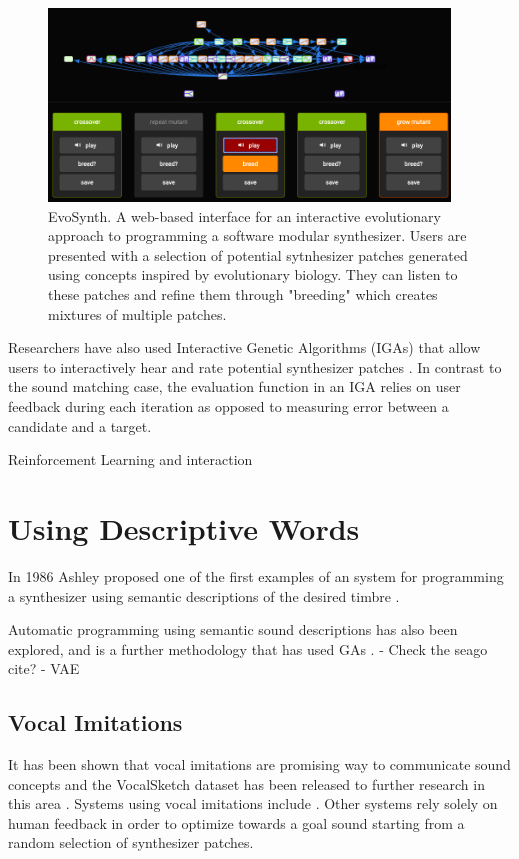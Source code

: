 \begin{figure}[ht]
    \centering
    \includegraphics[width=0.95\textwidth]{figures/background/EvoSynth.png}
    \caption{EvoSynth. A web-based interface for an interactive evolutionary approach to programming a software modular synthesizer. Users are presented with a selection of potential sytnhesizer patches generated using concepts inspired by evolutionary biology. They can listen to these patches and refine them through "breeding" which creates mixtures of multiple patches.}
    \label{fig:evosynth}
\end{figure}



Researchers have also used Interactive Genetic Algorithms (IGAs) that allow users to interactively hear and rate potential synthesizer patches \cite{johnson1999exploring, dahlstedt2001creating, yee2016use}. In contrast to the sound matching case, the evaluation function in an IGA relies on user feedback during each iteration as opposed to measuring error between a candidate and a target. 

Reinforcement Learning and interaction \cite{scurto2021designing}

\section{Using Descriptive Words}
In 1986 Ashley proposed one of the first examples of an system for programming a synthesizer using semantic descriptions of the desired timbre \cite{ashley1986knowledge}.

 Automatic programming using semantic sound descriptions has also been explored, and is a further methodology that has used GAs \cite{krekovic2016algorithm}.
 - Check the seago cite?
 \cite{roche2021make} - VAE

\subsection{Vocal Imitations}
It has been shown that vocal imitations are promising way to communicate sound concepts \cite{lemaitre2014effectiveness} and the VocalSketch dataset has been released to further research in this area \cite{cartwright2015vocalsketch}. Systems using vocal imitations include \cite{mcartwright2014}\cite{zhang2018visualization}. Other systems rely solely on human feedback in order to optimize towards a goal sound starting from a random selection of synthesizer patches.

